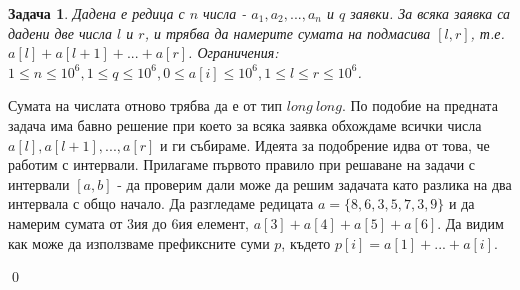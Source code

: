 \documentclass[]{article}
\newtheorem{problem}{Задача}
\newenvironment{solution}{\noindent{\bf Решение.}\hspace*{1em}}{\qed\par}
\begin{document}
\begin{problem}
Дадена е редица с $n$ числа - $a_1,a_2,...,a_n$ и $q$ заявки. За всяка заявка са дадени две числа $l$ и $r$, и трябва да намерите сумата на подмасива $[l, r]$, т.е. $a[l]+a[l+1]+...+a[r]$.\newline
Ограничения: $1\leq n\leq 10^6,1\leq q\leq 10^6,0 \leq a[i]\leq 10^6,1 \leq l\leq r\leq 10^6$.
\end{problem}
\begin{solution}
Сумата на числата отново трябва да е от тип $long\ long$.\newline
По подобие на предната задача има бавно решение при което за всяка заявка обхождаме всички числа $a[l],a[l+1],...,a[r]$ и ги събираме.\newline
Идеята за подобрение идва от това, че работим с интервали. Прилагаме първото правило при решаване на задачи с интервали $[a,b]$ - да проверим дали може да решим задачата като разлика на два интервала с общо начало.\newline
Да разгледаме редицата $a=\{8,6,3,5,7,3,9\}$ и да намерим сумата от 3ия до 6ия елемент, $a[3]+a[4]+a[5]+a[6]$. Да видим как може да използваме префиксните суми $p$, където $p[i]=a[1]+...+a[i]$.
\newline

\newline


\end{solution}
\end{document}

